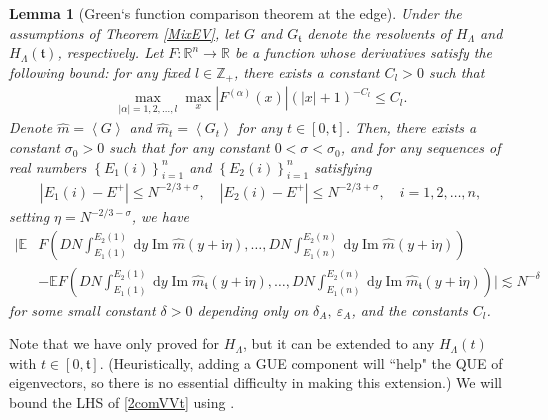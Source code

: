 \documentclass[10pt,reqno]{amsart}
\numberwithin{equation}{section}
\numberwithin{figure}{section}
\theoremstyle{plain} %
\newtheorem{lemma}[theorem]{Lemma}
\theoremstyle{definition} %
\newcommand{\wh}{\widehat}
\newcommand{\Z}{\mathbb{Z}}
\newcommand{\ft}{{\mathfrak t}}
\newcommand{\ii}{\mathrm{i}}
\newcommand{\pa}[1]{\left({#1}\right)}
\newcommand{\qa}[1]{\left[{#1}\right]}
\newcommand{\ha}[1]{\left\{{#1}\right\}}
\newcommand{\absa}[1]{\left\lvert #1 \right\rvert}
\newcommand{\avga}[1]{\left\langle #1 \right\rangle}
\numberwithin{equation}{section}
\begin{document}
\begin{lemma}[Green‘s function comparison theorem at the edge]\label{rescomY}
Under the assumptions of Theorem \ref{MixEV}, let $G$ and $G_{\ft}$ denote the resolvents of ${H_{\Lambda}}$ and ${H_{\Lambda}}(\ft)$, respectively. %
Let $F: \mathbb{R}^n \rightarrow \mathbb{R}$ be a function whose derivatives satisfy the following bound: for any fixed $l\in \Z_+$, there exists a constant $C_l>0$ such that
\begin{equation}\label{derivative_bound_F}
    \begin{aligned}
        \max_{\absa{\alpha}=1,2,\ldots,l}\max_x\left|F^{(\alpha)}(x)\right|(|x|+1)^{-C_l} \leqslant C_l.
    \end{aligned}
\end{equation}
Denote $\wh m=\avga{G}$ and $\wh m_t=\avga{G_t}$ for any $t\in \qa{0,\ft}$. Then, there exists a constant $\sigma_0>0$ such that for any constant $0<\sigma<\sigma_0$, and for any sequences of real numbers $\ha{E_1\pa{i}}_{i=1}^n$ and $\ha{E_2\pa{i}}_{i=1}^n$ satisfying
\begin{equation}\nonumber
    \begin{aligned}
        \left|E_1\pa{i}-E^+\right| \leqslant N^{-2 / 3+\sigma}, \quad\left|E_2\pa{i}-E^+\right| \leqslant N^{-2 / 3+\sigma}, \quad {i=1,2,\ldots,n},
    \end{aligned}
\end{equation}
setting $\eta=N^{-2 / 3-\sigma}$, we have
\begin{equation}\label{2comVVt}
    \begin{aligned}
        \Bigg|\mathbb{E} &F\left({DN} \int_{E_1\pa{1}}^{E_2\pa{1}} \mathrm{~d} y \operatorname{Im} \wh m(y+\ii \eta),\ldots,DN \int_{E_1\pa{n}}^{E_2\pa{n}} \mathrm{~d} y \operatorname{Im} \wh m(y+\ii \eta)\right)\\
        &-\mathbb{E} F\left(DN \int_{E_1\pa{1}}^{E_2\pa{1}} \mathrm{~d} y \operatorname{Im} \wh m_{\ft}(y+\ii \eta),\ldots,DN \int_{E_1\pa{n}}^{E_2\pa{n}} \mathrm{~d} y \operatorname{Im} \wh m_{\ft}(y+\ii \eta)\right)\Bigg| \lesssim N^{-\delta}
    \end{aligned}
\end{equation}
for some small constant $\delta>0$ depending only on $\delta_A,\ \varepsilon_A$, and the constants $C_l$.
\end{lemma}

Note that we have only proved  for ${H_{\Lambda}}$, but it can be extended to any ${H_{\Lambda}}(t)$ with $t\in [0,\ft]$. (Heuristically, adding a GUE component will ``help" the QUE of eigenvectors, so there is no essential difficulty in making this extension.) We will bound the LHS of \eqref{2comVVt} using .
\end{document}
